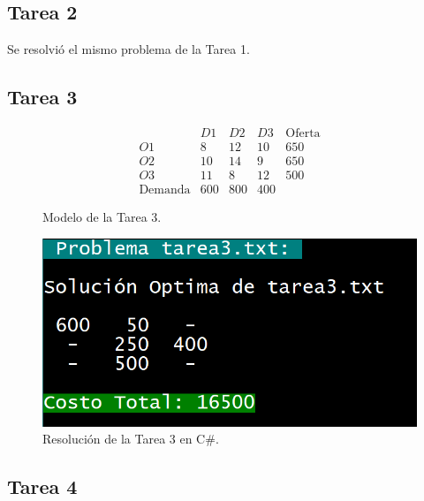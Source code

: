 \documentclass[a4paper, 12pt]{article}
\begin{document}
    \subsection{Tarea 2}
    Se resolvió el mismo problema de la Tarea 1.
    \subsection{Tarea 3}
    \begin{figure}[H]
        \[\begin{matrix}
            &D1&D2&D3&\text{Oferta}\\
        O1&8&12&10&650\\
        O2&10&14&9&650\\
        O3&11&8&12&500\\
        \text{Demanda}&600&800&400
        \end{matrix}\]
        \caption{Modelo de la Tarea 3.}
    \end{figure}
    \begin{figure}[H]
        \centering
        \includegraphics[width=12cm]{tarea3U2.PNG}
        \caption{Resolución de la Tarea 3 en C\#.}
    \end{figure}
    \subsection{Tarea 4}
\end{document}
